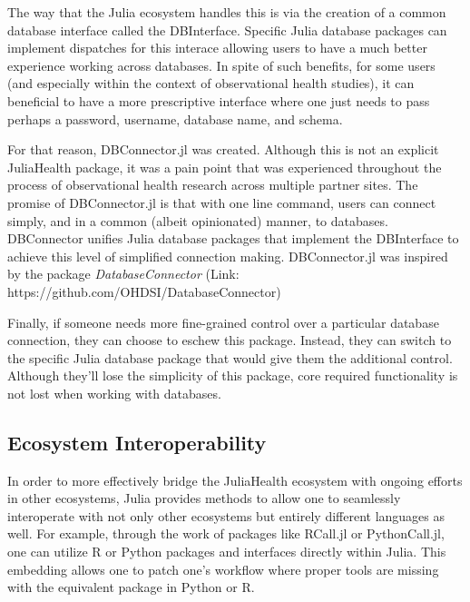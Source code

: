 \documentclass{juliacon}
\begin{document}
The way that the Julia ecosystem handles this is via the creation of a common database interface called the DBInterface.
Specific Julia database packages can implement dispatches for this interace allowing users to have a much better experience working across databases.
In spite of such benefits, for some users (and especially within the context of observational health studies), it can beneficial to have a more prescriptive interface where one just needs to pass perhaps a password, username, database name, and schema.

For that reason, DBConnector.jl was created.
Although this is not an explicit JuliaHealth package, it was a pain point that was experienced throughout the process of observational health research across multiple partner sites.
The promise of DBConnector.jl is that with one line command, users can connect simply, and in a common (albeit opinionated) manner, to databases.
DBConnector unifies Julia database packages that implement the DBInterface to achieve this level of simplified connection making.
DBConnector.jl was inspired by the package \textit{DatabaseConnector} (Link: https://github.com/OHDSI/DatabaseConnector)

Finally, if someone needs more fine-grained control over a particular database connection, they can choose to eschew this package.
Instead, they can switch to the specific Julia database package that would give them the additional control.
Although they'll lose the simplicity of this package, core required functionality is not lost when working with databases.

\subsection{Ecosystem Interoperability}

In order to more effectively bridge the JuliaHealth ecosystem with ongoing efforts in other ecosystems, Julia provides methods to allow one to seamlessly interoperate with not only other ecosystems but entirely different languages as well.
For example, through the work of packages like RCall.jl or PythonCall.jl, one can utilize R or Python packages and interfaces directly within Julia. \cite{PythonCall.jl} \cite{RCallJl}
This embedding allows one to patch one's workflow where proper tools are missing with the equivalent package in Python or R.
\end{document}
